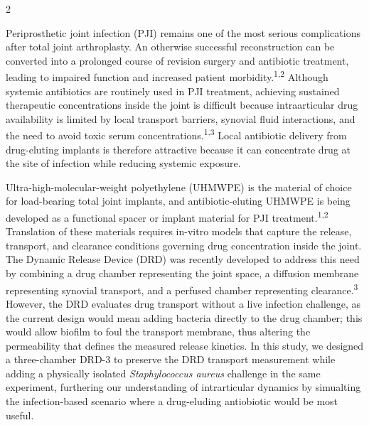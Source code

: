 \documentclass[8pt]{extarticle}
\newcommand{\osec}[1]{\par\vspace{0.5pt}\noindent{\bfseries\color{tealc}#1.}\hspace{0.6em}\ignorespaces}
\begin{document}
\begin{multicols}{2}
\normalsize
\linespread{0.82}\selectfont

\osec{Introduction}
Periprosthetic joint infection (PJI) remains one of the most serious complications after total joint arthroplasty. An otherwise successful reconstruction can be converted into a prolonged course of revision surgery and antibiotic treatment, leading to impaired function and increased patient morbidity.\textsuperscript{1,2} Although systemic antibiotics are routinely used in PJI treatment, achieving sustained therapeutic concentrations inside the joint is difficult because intraarticular drug availability is limited by local transport barriers, synovial fluid interactions, and the need to avoid toxic serum concentrations.\textsuperscript{1,3} Local antibiotic delivery from drug-eluting implants is therefore attractive because it can concentrate drug at the site of infection while reducing systemic exposure.

Ultra-high-molecular-weight polyethylene (UHMWPE) is the material of choice for load-bearing total joint implants, and antibiotic-eluting UHMWPE is being developed as a functional spacer or implant material for PJI treatment.\textsuperscript{1,2} Translation of these materials requires in-vitro models that capture the release, transport, and clearance conditions governing drug concentration inside the joint. The Dynamic Release Device (DRD) was recently developed to address this need by combining a drug chamber representing the joint space, a diffusion membrane representing synovial transport, and a perfused chamber representing clearance.\textsuperscript{3} However, the DRD evaluates drug transport without a live infection challenge, as the current design would mean adding bacteria directly to the drug chamber; this would allow biofilm to foul the transport membrane, thus altering the permeability that defines the measured release kinetics. In this study, we designed a three-chamber DRD-3 to preserve the DRD transport measurement while adding a physically isolated \emph{Staphylococcus aureus} challenge in the same experiment, furthering our understanding of intrarticular dynamics by simualting the infection-based scenario where a drug-eluding antiobiotic would be most useful.


\end{multicols}
\end{document}
